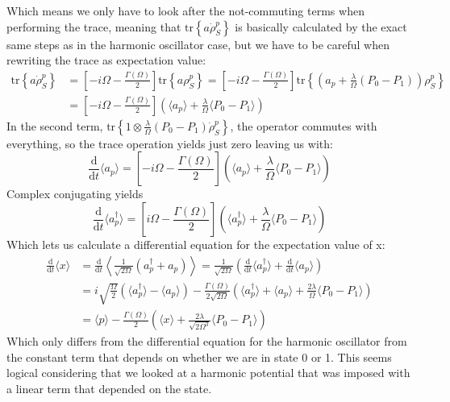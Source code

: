 	Which means we only have to look after the not-commuting terms when performing the trace, meaning that $	\text{tr} \left\{a \dot{\rho}_S^p\right\}$ is basically calculated by the exact same steps as in the harmonic oscillator case, but we have to be careful when rewriting the trace as expectation value:
	\begin{align*}
		\text{tr} \left\{a \dot{\rho}_S^p\right\} &=	\left[-i \Omega - \frac{\Gamma(\Omega)}{2}\right] \text{tr}\left\{a \rho_S^p\right\} = \left[-i \Omega - \frac{\Gamma(\Omega)}{2}\right] \text{tr}\left\{\left(a_p + \frac{\lambda}{\Omega} (P_0 - P_1)\right) \rho_S^p\right\} \\
		&= \left[-i \Omega - \frac{\Gamma(\Omega)}{2}\right] \left( \langle a_p \rangle + \frac{\lambda}{\Omega } \langle P_0 - P_1 \rangle\right)
	\end{align*}
	In the second term, $\text{tr} \left\{1 \otimes \frac{\lambda}{\Omega} (P_0 - P_1) \dot{\rho}_S^p\right\}$, the operator commutes with everything, so the trace operation yields just zero leaving us with:
	\begin{equation}
		\frac{\text{d}}{\text{d}t} \langle a_p \rangle = \left[-i \Omega - \frac{\Gamma(\Omega)}{2}\right] \left( \langle a_p \rangle + \frac{\lambda}{\Omega } \langle P_0 - P_1 \rangle\right)
	\end{equation}
	Complex conjugating yields
	\begin{equation}
		\frac{\text{d}}{\text{d}t} \langle a_p^\dagger \rangle = \left[i \Omega - \frac{\Gamma(\Omega)}{2}\right] \left( \langle a_p^\dagger \rangle + \frac{\lambda}{\Omega } \langle P_0 - P_1 \rangle\right)
	\end{equation}
	Which lets us calculate a differential equation for the expectation value of x:
	\begin{align}
		\frac{\text{d}}{\text{d}t} \langle x \rangle &= \frac{\text{d}}{\text{d}t} \left\langle \frac{1}{\sqrt{2 \Omega}}(a_p^\dagger + a_p) \right\rangle =	\frac{1}{\sqrt{2 \Omega}} \left(\frac{\text{d}}{\text{d}t} \langle a_p^\dagger \rangle + \frac{\text{d}}{\text{d}t} \langle a_p \rangle\right) \\
		&= i\sqrt{\frac{\Omega}{2}} \left( \langle a_p^\dagger \rangle - \langle a_p \rangle \right) - \frac{\Gamma(\Omega)}{2 \sqrt{2 \Omega}} \left( \langle a_p^\dagger \rangle + \langle a_p \rangle +  \frac{2 \lambda}{\Omega } \langle P_0 - P_1 \rangle \right) \\
		&= \langle p \rangle - \frac{\Gamma(\Omega)}{2} \left( \langle x \rangle + \frac{2\lambda}{\sqrt{2 \Omega^3} } \langle P_0 - P_1 \rangle\right)
	\end{align}
	Which only differs from the differential equation for the harmonic oscillator from the constant term that depends on whether we are in state 0 or 1. This seems logical considering that we looked at a harmonic potential that was imposed with a linear term that depended on the state.
	
